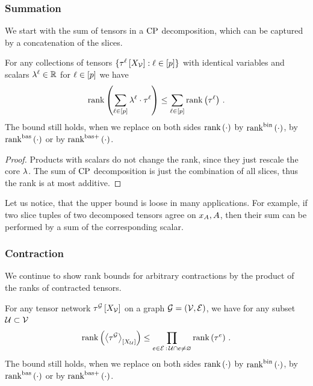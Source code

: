 \subsubsection{Summation}

We start with the sum of tensors in a $\mathrm{CP}$ decomposition, which can be captured by a concatenation of the slices.

\begin{theorem}
    \label{the:CPrankSumBound}
    For any collections of tensors $\{\tau^{\ell}\left[X_{\mathcal{V}}\right] : \ell\in[p]\}$ with identical variables and scalars $\lambda^{\ell} \in \mathbb{R}$ for $\ell\in[p]$ we have
    \begin{align*}
        \mathrm{rank}\left(\sum_{\ell\in[p]} \lambda^{\ell} \cdot \tau^{\ell}\right) \leq \sum_{\ell\in[p]} \mathrm{rank}\left(\tau^{\ell}\right)  \, .
    \end{align*}
    The bound still holds, when we replace on both sides $\mathrm{rank}\left(\cdot\right)$ by $\mathrm{rank}^{\mathrm{bin}}\left(\cdot\right)$, by $\mathrm{rank}^{\mathrm{bas}}\left(\cdot\right)$ or by $\mathrm{rank}^{\mathrm{bas+}}\left(\cdot\right)$.
\end{theorem}
\begin{proof}
    Products with scalars do not change the rank, since they just rescale the core $\lambda$.
    The sum of $\mathrm{CP}$ decomposition is just the combination of all slices, thus the rank is at most additive.
\end{proof}

Let us notice, that the upper bound is loose in many applications.
For example, if two slice tuples of two decomposed tensors agree on $x_{A},A$, then their sum can be performed by a sum of the corresponding scalar.


\subsubsection{Contraction}

We continue to show rank bounds for arbitrary contractions by the product of the ranks of contracted tensors.

\begin{theorem}
    \label{the:CPrankContractionBound}
    For any tensor network $\tau^{\mathcal{G}}\left[X_{\mathcal{V}}\right]$ on a graph $\mathcal{G}=(\mathcal{V},\mathcal{E})$, we have for any subset $\mathcal{U}\subset\mathcal{V}$
    \begin{align*}
        \mathrm{rank}\left(\left\langle \tau^{\mathcal{G}}\right\rangle_{\left[ X_{\mathcal{U}} \right]}\right) \leq
        \prod_{e\in\mathcal{E} \,:\, \mathcal{U}\cap e \neq \varnothing} \mathrm{rank}\left(\tau^{e}\right) \, .
    \end{align*}
    The bound still holds, when we replace on both sides $\mathrm{rank}\left(\cdot\right)$ by $\mathrm{rank}^{\mathrm{bin}}\left(\cdot\right)$, by $\mathrm{rank}^{\mathrm{bas}}\left(\cdot\right)$ or by $\mathrm{rank}^{\mathrm{bas+}}\left(\cdot\right)$.
\end{theorem}

